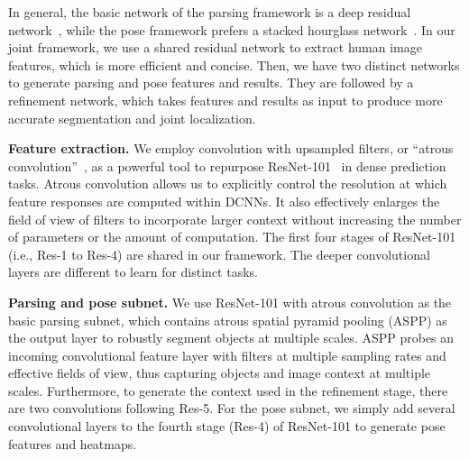 \documentclass[10pt,journal,compsoc]{IEEEtran}
\begin{document}
In general, the basic network of the parsing framework is a deep residual network~\cite{he2015deep}, while the pose framework prefers a stacked hourglass network~\cite{newell2016stacked}. In our joint framework, we use a shared residual network to extract human image features, which is more efficient and concise. Then, we have two distinct networks to generate parsing and pose features and results. They are followed by a refinement network, which takes features and results as input to produce more accurate segmentation and joint localization.

\textbf{Feature extraction.}
We employ convolution with upsampled filters, or ``atrous convolution''~\cite{chen2016deeplab}, as a powerful tool to repurpose ResNet-101~\cite{he2015deep} in dense prediction tasks. Atrous convolution allows us to explicitly control the resolution at which feature responses are computed within DCNNs. It also effectively enlarges the field of view of filters to incorporate larger context without increasing the number of parameters or the amount of computation. The first four stages of ResNet-101 (i.e., Res-1 to Res-4) are shared in our framework. The deeper convolutional layers are different to learn for distinct tasks.

\textbf{Parsing and pose subnet.}
We use ResNet-101 with atrous convolution as the basic parsing subnet, which contains atrous spatial pyramid pooling (ASPP) as the output layer to robustly segment objects at multiple scales. ASPP probes an incoming convolutional feature layer with filters at multiple sampling rates and effective fields of view, thus capturing objects and image context at multiple scales. Furthermore, to generate the context used in the refinement stage, there are two convolutions following Res-5. For the pose subnet, we simply add several  convolutional layers to the fourth stage (Res-4) of ResNet-101 to generate pose features and heatmaps.
\end{document}
